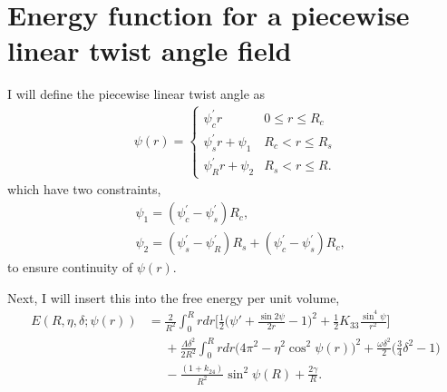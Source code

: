 \documentclass[12pt]{article}
\begin{document}


\section{Energy function for a piecewise linear twist angle field}
I will define the piecewise linear twist angle as
\begin{align}\label{eq:basicpiecewise}
\psi(r)=
\begin{cases}
	\psi_c^{\prime} r					& 0 \leq r \leq R_c \\
	\psi_s^{\prime} r +\psi_1			& R_c < r \leq R_s \\
	\psi_R^{\prime}r+\psi_2				& R_s < r \leq R.
\end{cases}
\end{align}
which have two constraints,
\begin{subequations}
\begin{align}
&\psi_1=(\psi_c^{\prime}-\psi_s^{\prime})R_c\label{eq:psi1},\\
&\psi_2=(\psi_s^{\prime}-\psi_R^{\prime})R_s+(\psi_c^{\prime}-\psi_s^{\prime})R_c\label{eq:psi2},
\end{align}
\end{subequations}
to ensure continuity of $\psi(r)$.

Next, I will insert this into the free energy per unit volume,
\begin{align}\label{eq:startE}
E(R,\eta,\delta;\psi(r))&=\frac{2}{R^2}\int_0^{R}rdr\bigg[\frac{1}{2}\bigg(\psi'+\frac{\sin2\psi}{2r}-1\bigg)^2+\frac{1}{2}K_{33}\frac{\sin^4\psi}{r^2}\bigg]\nonumber\\
&\phantom{=}+\frac{\Lambda\delta^2}{2R^2}\int_0^{R}rdr\big(4\pi^2-\eta^2\cos^2\psi(r)\big)^2+\frac{\omega\delta^2}{2}\bigg(\frac{3}{4}\delta^2-1\bigg)\nonumber\\
&\phantom{=}-\frac{(1+k_{24})}{R^2}\sin^2\psi(R)+\frac{2\gamma}{R}.
\end{align}
\end{document}
